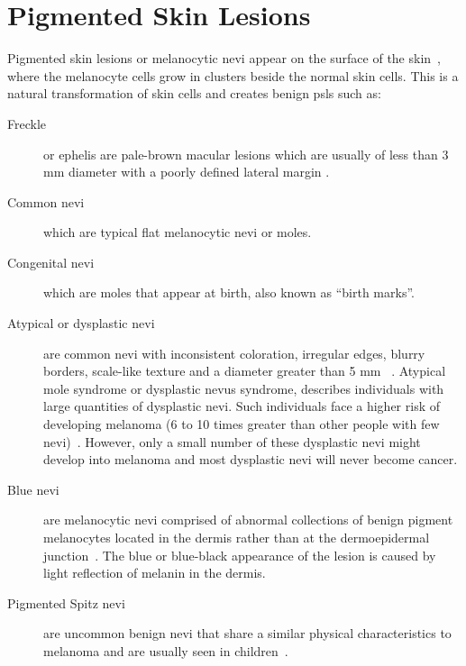 \section{Pigmented Skin Lesions}\label{sec:chp1sec2}

Pigmented skin lesions or melanocytic nevi appear on the surface of the skin~\cite{kaufman2005melanoma}, where the melanocyte cells grow in clusters beside the normal skin cells. 
This is a natural transformation of skin cells and creates benign \ac{psls} such as: 


\begin{description}
   \item [Freckle] or ephelis are pale-brown macular lesions which are usually of less than 3 \si{\milli\meter} diameter with a poorly defined lateral margin \cite{newton2010lentigos}. 
   \item [Common nevi] which are typical flat melanocytic nevi or moles.
   \item [Congenital nevi] which are moles that appear at birth, also known as ``birth marks''.
   \item [Atypical or dysplastic nevi] are common nevi with inconsistent coloration, irregular edges, blurry borders, scale-like texture and a diameter greater than 5 \si{\milli\meter} ~\cite{kaufman2005melanoma}. 
Atypical mole syndrome or dysplastic nevus syndrome, describes individuals with large quantities of dysplastic nevi. 
Such individuals face a higher risk of developing melanoma (6 to 10 times greater than other people with few nevi)~\cite{newton2010lentigos}. 
However, only a small number of these dysplastic nevi might develop into melanoma and most dysplastic nevi will never become cancer.

  \item [Blue nevi] are melanocytic nevi comprised of abnormal collections of benign pigment melanocytes located in the dermis rather than at the dermoepidermal junction~\cite{newton2010lentigos}.
The blue or blue-black appearance of the lesion is caused by light reflection of melanin in the dermis.  
  \item [Pigmented Spitz nevi] are uncommon benign nevi that share a similar physical characteristics to melanoma and are usually seen in children~\cite{newton2010lentigos}. 

\end{description}

